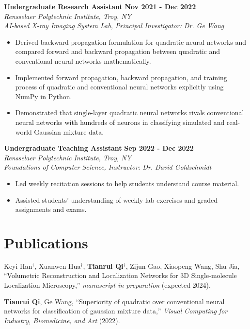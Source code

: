 \documentclass[letterpaper, 11pt]{article}
\newcommand{\subsectionvspace}{\vspace{6pt}}
\begin{document}
    \textbf{Undergraduate Research Assistant} \hfill 
    \textbf{Nov 2021 - Dec 2022} \\
    \textit{Rensselaer Polytechnic Institute, Troy, NY} \\
    \textit{AI-based X-ray Imaging System Lab, Principal Investigator: Dr. Ge Wang}
    \begin{itemize}
        \item Derived backward propagation formulation for quadratic neural networks and compared forward and backward propagation between quadratic and conventional neural networks mathematically.
        \item Implemented forward propagation, backward propagation, and training process of quadratic and conventional neural networks explicitly using NumPy in Python.
        \item Demonstrated that single-layer quadratic neural networks rivals conventional neural networks with hundreds of neurons in classifying simulated and real-world Gaussian mixture data.
    \end{itemize}

    \subsectionvspace

    \textbf{Undergraduate Teaching Assistant} \hfill 
    \textbf{Sep 2022 - Dec 2022} \\
    \textit{Rensselaer Polytechnic Institute, Troy, NY} \\
    \textit{Foundations of Computer Science, Instructor: Dr. David Goldschmidt}
    \begin{itemize}
        \item Led weekly recitation sessions to help students understand course material.
        \item Assisted students' understanding of weekly lab exercises and graded assignments and exams.
    \end{itemize}


\section{Publications}


    Keyi Han$^\dag$, Xuanwen Hua$^\dag$, \textbf{Tianrui Qi}$^\dag$, Zijun Gao, Xiaopeng Wang, Shu Jia, ``Volumetric Reconstruction and Localization Networks for 3D Single-molecule Localization Microscopy,'' \textit{manuscript in preparation} (expected 2024).

    \subsectionvspace

    \textbf{Tianrui Qi}, Ge Wang, ``Superiority of quadratic over conventional neural networks for classification of gaussian mixture data,'' \textit{Visual Computing for Industry, Biomedicine, and Art} (2022).
\end{document}
